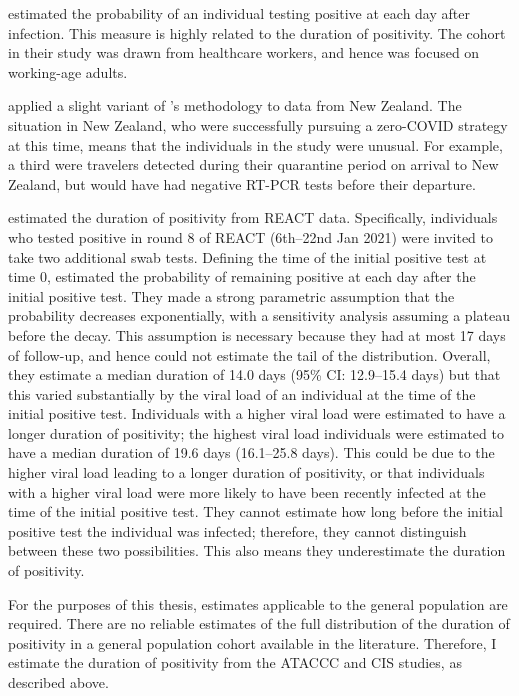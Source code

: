 \documentclass[thesis.tex]{subfiles}
\begin{document}
\Textcite{hellewellPCRSensitivity} estimated the probability of an individual testing positive at each day after infection.
This measure is highly related to the duration of positivity.
The cohort in their study was drawn from healthcare workers, and hence was focused on working-age adults.

\Textcite{binnySensitivity} applied a slight variant of \textcite{hellewellPCRSensitivity}'s methodology to data from New Zealand.
The situation in New Zealand, who were successfully pursuing a zero-COVID strategy at this time, means that the individuals in the study were unusual.
For example, a third were travelers detected during their quarantine period on arrival to New Zealand, but would have had negative RT-PCR tests before their departure.

\Textcite{ealesCharacterising} estimated the duration of positivity from REACT data.
Specifically, individuals who tested positive in round 8 of REACT (6th--22nd Jan 2021) were invited to take two additional swab tests.
Defining the time of the initial positive test at time 0, \textcite{ealesCharacterising} estimated the probability of remaining positive at each day after the initial positive test.
They made a strong parametric assumption that the probability decreases exponentially, with a sensitivity analysis assuming a plateau before the decay.
This assumption is necessary because they had at most 17 days of follow-up, and hence could not estimate the tail of the distribution.
Overall, they estimate a median duration of 14.0 days (95\% CI: 12.9--15.4 days) but that this varied substantially by the viral load of an individual at the time of the initial positive test.
Individuals with a higher viral load were estimated to have a longer duration of positivity; the highest viral load individuals were estimated to have a median duration of 19.6 days (16.1--25.8 days).
This could be due to the higher viral load leading to a longer duration of positivity, or that individuals with a higher viral load were more likely to have been recently infected at the time of the initial positive test.
They cannot estimate how long before the initial positive test the individual was infected; therefore, they cannot distinguish between these two possibilities.
This also means they underestimate the duration of positivity.

For the purposes of this thesis, estimates applicable to the general population are required.
There are no reliable estimates of the full distribution of the duration of positivity in a general population cohort available in the literature.
Therefore, I estimate the duration of positivity from the ATACCC and CIS studies, as described above.
\end{document}

